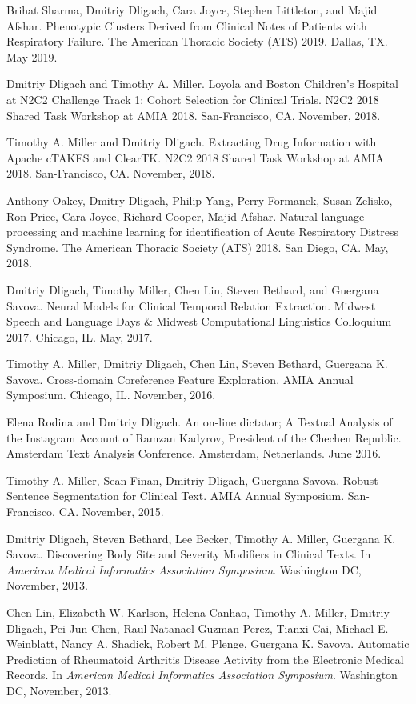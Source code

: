 \documentclass[letterpaper]{article}
\renewenvironment{itemize}{
  \begin{list}{}{
    \setlength{\leftmargin}{1.5em}
  }
}{
  \end{list}
}
\begin{document}
\begin{itemize}
\item Brihat Sharma, Dmitriy Dligach, Cara Joyce, Stephen Littleton, and Majid Afshar. Phenotypic Clusters Derived from Clinical Notes of Patients with Respiratory Failure. The American Thoracic Society (ATS) 2019. Dallas, TX. May 2019.
\item Dmitriy Dligach and Timothy A. Miller. Loyola and Boston Children's Hospital at N2C2 Challenge Track 1: Cohort Selection for Clinical Trials. N2C2 2018 Shared Task Workshop at AMIA 2018. San-Francisco, CA. November, 2018.
\item Timothy A. Miller and Dmitriy Dligach. Extracting Drug Information with Apache cTAKES and ClearTK. N2C2 2018 Shared Task Workshop at AMIA 2018. San-Francisco, CA. November, 2018.
\item Anthony Oakey, Dmitry Dligach, Philip Yang, Perry Formanek, Susan Zelisko, Ron Price, Cara Joyce, Richard Cooper, Majid Afshar. Natural language processing and machine learning for identification of Acute Respiratory Distress Syndrome. The American Thoracic Society (ATS) 2018. San Diego, CA. May, 2018.
\item Dmitriy Dligach, Timothy Miller, Chen Lin, Steven Bethard, and Guergana Savova. Neural Models for Clinical Temporal Relation Extraction. Midwest Speech and Language Days \& Midwest Computational Linguistics Colloquium 2017. Chicago, IL. May, 2017.
\item Timothy A. Miller, Dmitriy Dligach, Chen Lin, Steven Bethard, Guergana K. Savova. Cross-domain Coreference Feature Exploration. AMIA Annual Symposium. Chicago, IL. November, 2016.
\item Elena Rodina and Dmitriy Dligach. An on-line dictator; A Textual Analysis of the Instagram Account of Ramzan Kadyrov, President of the Chechen Republic. Amsterdam Text Analysis Conference. Amsterdam, Netherlands. June 2016.
\item Timothy A. Miller, Sean Finan, Dmitriy Dligach, Guergana Savova. Robust Sentence Segmentation for Clinical Text. AMIA Annual Symposium. San-Francisco, CA. November, 2015.
\item Dmitriy Dligach, Steven Bethard, Lee Becker, Timothy A. Miller, Guergana K. Savova. Discovering Body Site and Severity Modifiers in Clinical Texts. In \emph{American Medical Informatics Association Symposium}. Washington DC, November, 2013.
\item Chen Lin, Elizabeth W. Karlson, Helena Canhao, Timothy A. Miller, Dmitriy Dligach, Pei Jun Chen, Raul Natanael Guzman Perez, Tianxi Cai, Michael E. Weinblatt, Nancy A. Shadick, Robert M. Plenge, Guergana K. Savova. Automatic Prediction of Rheumatoid Arthritis Disease Activity from the Electronic Medical Records. In \emph{American Medical Informatics Association Symposium}. Washington DC, November, 2013.

\end{itemize}
\end{document}
